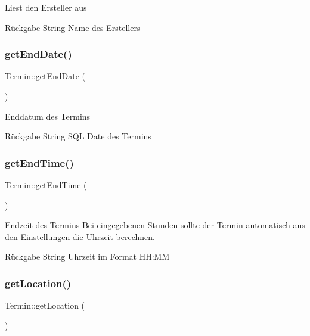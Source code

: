 Liest den Ersteller aus \begin{DoxyReturn}{Rückgabe}
String Name des Erstellers 
\end{DoxyReturn}
\mbox{\label{interface_termin_afa0a9c0bb04251fde3dcd65e45ebec18}} 
\subsubsection{\texorpdfstring{get\+End\+Date()}{getEndDate()}}
{\footnotesize\ttfamily Termin\+::get\+End\+Date (\begin{DoxyParamCaption}{ }\end{DoxyParamCaption})}

Enddatum des Termins \begin{DoxyReturn}{Rückgabe}
String S\+QL Date des Termins 
\end{DoxyReturn}
\mbox{\label{interface_termin_a2c967074ee189a6e1fcf0a40cb71a4a4}} 
\subsubsection{\texorpdfstring{get\+End\+Time()}{getEndTime()}}
{\footnotesize\ttfamily Termin\+::get\+End\+Time (\begin{DoxyParamCaption}{ }\end{DoxyParamCaption})}

Endzeit des Termins Bei eingegebenen Stunden sollte der \mbox{\hyperlink{interface_termin}{Termin}} automatisch aus den Einstellungen die Uhrzeit berechnen. \begin{DoxyReturn}{Rückgabe}
String Uhrzeit im Format HH\+:MM 
\end{DoxyReturn}
\mbox{\label{interface_termin_aeea92d8a1dccea73510e4c4b71a828c7}} 
\subsubsection{\texorpdfstring{get\+Location()}{getLocation()}}
{\footnotesize\ttfamily Termin\+::get\+Location (\begin{DoxyParamCaption}{ }\end{DoxyParamCaption})}

